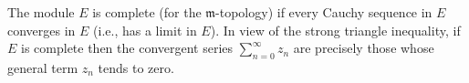 The module $E$ is complete (for the $\mathfrak{m}$-topology) if every Cauchy sequence in $E$ converges in $E$ (i.e., has a limit in $E$). In view of the strong triangle inequality, if $E$ is complete then the convergent series $\sum_{n=0}^{\infty} z_n$ are precisely those whose general term $z_n$ tends to zero.